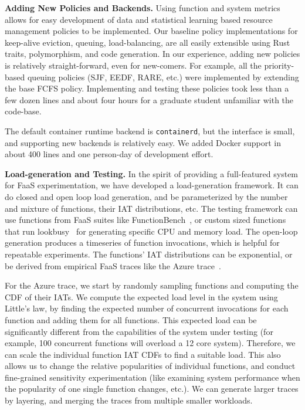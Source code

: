 \noindent \textbf{Adding New Policies and Backends.}
%
Using function and system metrics allows for easy development of data and statistical learning based resource management policies to be implemented.
Our baseline policy implementations for keep-alive eviction, queuing, load-balancing, are all easily extensible using Rust traits, polymorphism, and code generation. 
In our experience, adding new policies is relatively straight-forward, even for new-comers.
For example, all the priority-based queuing policies (SJF, EEDF, RARE, etc.) were implemented by extending the base FCFS policy.
Implementing and testing these policies took less than a few dozen lines and about four hours for a graduate student unfamiliar with the code-base. 

The default container runtime backend is \texttt{containerd}, but the interface is small, and supporting new backends is relatively easy.
We added Docker support in about 400 lines and one person-day of development effort.


\textbf{Load-generation and Testing.}
In the spirit of providing a full-featured system for FaaS experimentation, we have developed a load-generation framework.
It can do closed and open loop load generation, and be parameterized by the number and mixture of functions, their IAT distributions, etc. 
The testing framework can use functions from FaaS suites like FunctionBench~\cite{kim2019functionbench}, or custom sized functions that run lookbusy~\cite{lookbusy} for generating specific CPU and memory load.
%
The open-loop generation produces a timeseries of function invocations, which is helpful for repeatable experiments.
The functions' IAT distributions can be exponential, or be derived from empirical FaaS traces like the Azure trace~\cite{shahrad_serverless_2020}.


For the Azure trace, we start by randomly sampling functions and computing the CDF of their IATs.
We compute the expected load level in the system using Little's law, by finding the expected number of concurrent invocations for each function and adding them for all functions.
This expected load can be significantly different from the capabilities of the system under testing (for example, 100 concurrent functions will overload a 12 core system). 
Therefore, we can scale the individual function IAT CDFs to find a suitable load. This also allows us to change the relative popularities of individual functions, and conduct fine-grained sensitivity experimentation (like examining system performance when the popularity of one single function
changes, etc.).
We can generate larger traces by layering, and merging the traces from multiple smaller workloads.  



